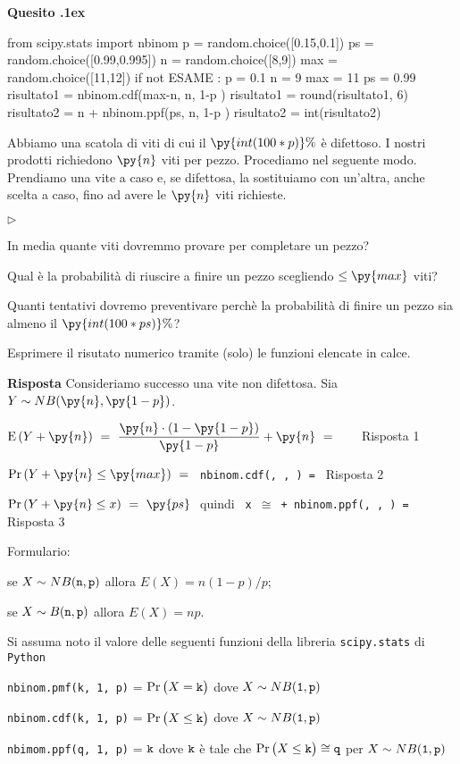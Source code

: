 \documentclass[11pt,twoside,a4paper]{article}
\newcommand{\mylabel}[1]{#1\hfill}
\renewenvironment{itemize}
  {\begin{list}{$\triangleright$}{%
   \setlength{\parskip}{0mm}
   \setlength{\topsep}{.4\baselineskip}
   \setlength{\rightmargin}{0mm}
   \setlength{\listparindent}{0mm}
   \setlength{\itemindent}{0mm}
   \setlength{\labelwidth}{2ex}
   \setlength{\itemsep}{.4\baselineskip}
   \setlength{\parsep}{0mm}
   \setlength{\partopsep}{0mm}
   \setlength{\labelsep}{1ex}
   \setlength{\leftmargin}{\labelwidth+\labelsep}
   \let\makelabel\mylabel}}{%
   \end{list}\vspace*{-1.3mm}}
\newcounter{quesito}
\newenvironment{question}{\addtocounter{quesito}{1}\par\textbf{Quesito \thequesito.\kern1ex}}{\vspace{0.5\parskip}}
\newenvironment{answer}{\par\textbf{Risposta\quad}}{\vspace{\parskip}}
\begin{document}
\begin{question}
\def\Pr{{\rm Pr\,}}
\def\Ex{{\rm E\,}}
\def\Var{{\rm Var\,}}
\begin{pycode}
from scipy.stats import nbinom
p  = random.choice([0.15,0.1])
ps = random.choice([0.99,0.995])
n = random.choice([8,9])
max = random.choice([11,12])
if not ESAME :
   p = 0.1
   n = 9
   max = 11
   ps = 0.99
risultato1 = nbinom.cdf(max-n, n, 1-p )
risultato1 = round(risultato1, 6)
risultato2 = n + nbinom.ppf(ps, n, 1-p )
risultato2 = int(risultato2)
\end{pycode}
Abbiamo una scatola di viti di cui il $\py{int(100*p)}\%$ è difettoso. I nostri prodotti richiedono $\py{n}$ viti per pezzo. Procediamo nel seguente modo. Prendiamo una vite a caso e, se difettosa, la sostituiamo con un'altra, anche scelta a caso, fino ad avere le $\py{n}$ viti richieste.
\begin{itemize}
\item[1.] In media quante viti dovremmo provare per completare un pezzo?
\item[2.] Qual è la probabilità di riuscire a finire un pezzo scegliendo $\le\py{max}$ viti? 
\item[3.] Quanti tentativi dovremo preventivare perchè la probabilità di finire un pezzo sia almeno il $\py{int(100*ps)}\%$? 
\end{itemize}

Esprimere il risutato numerico tramite (solo) le funzioni elencate in calce. 
\begin{answer}
Consideriamo successo una vite non difettosa. Sia $Y\sim NB(\py{n},\py{1-p})$.

$\Ex(Y+\py{n})\ =\ \dfrac{\py{n}\cdot(1-\py{1-p})}{\py{1-p}}+\py{n}\ =\ ${\tt{\color{blue}\   } } {\color{blue}\hfill Risposta 1}

$\Pr(Y+\py{n}\le\py{max})\ =\ ${\tt{\color{blue}\ nbinom.cdf(, ,  ) }=  } {\color{blue}\hfill Risposta 2}

\smallskip
$\Pr(Y+\py{n}\le x)\ =\ \py{ps}\ $ quindi {\tt{\color{blue}\ x $\cong$  + nbinom.ppf(, ,  ) }=  } {\color{blue}\hfill Risposta 3}\par

\end{answer}
\end{question}


\vfill
\hrulefill

Formulario: 

se $X\sim NB({\tt n},{\tt p})$ allora $E(X)=n(1-p)/p$; 

se $X\sim B({\tt n},{\tt p})$ allora $E(X)=np$.

Si assuma noto il valore delle seguenti funzioni della libreria {\tt scipy.stats\/} di  {\tt Python\/}

{\tt nbinom.pmf(k, 1, p)} = $\Pr\big(X={\tt k}\big)$ dove $X\sim NB({\tt 1},{\tt p})$ 

{\tt nbinom.cdf(k, 1, p)} = $\Pr\big(X\le{\tt k}\big)$ dove  $X\sim NB({\tt 1},{\tt p})$ 

{\tt nbimom.ppf(q, 1, p)} = ${\tt k}$ dove ${\tt k}$ è tale che $\Pr\big(X\le{\tt k}\big)\cong{\tt q}$ per $X\sim NB({\tt 1},{\tt p})$ 
\end{document}
